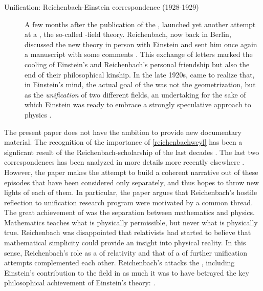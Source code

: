 \documentclass[draft]{article}
\newcommand{\PRZL}{\citetitle{Reichenbach1928}\xspace}
\newcommand{\FP}{\german{Fernparallelismus}\xspace}
\begin{document}
\begin{description}
\item[Unification: Reichenbach-Einstein correspondence (1928-1929)]\label{reichenbacheinsteinII}   A few months after the publication of the \PRZL \citep{Reichenbach1928}, \citet{Einstein19281,Einstein19282} launched yet another attempt at a \uft, the so-called \FP-field theory. Reichenbach, now back in Berlin, discussed the new theory in person with Einstein and sent him once again a manuscript with some comments \citep{Reichenbach1928b}. This exchange of letters marked the cooling of Einstein's and Reichenbach's personal friendship but also the end of their philosophical kinship. In the late 1920s, \citet{Reichenbach1929a,Reichenbach1929b,Reichenbach1929c} came to realize that, in Einstein's mind, the actual goal of the \uftp was not the geometrization, but as the \emph{unification} of two different fields, an undertaking for the sake of which Einstein was ready to embrace a strongly speculative approach to physics \citep{Dongen2010}.  
\end{description}

The present paper does not have the ambition to provide new documentary material. The recognition of the importance of \cref{reichenbachweyl} has been a signficant result of the Reichenbach-scholarship of the last decades \citep{Ryckman1995,Ryckman1996}. The last two correspondences has been analyzed in more details more recently elsewhere \citep{Giovanelli2016d,Giovanelli2022}. However, the paper makes the attempt to build a coherent narrative out of these episodes that have been considered only separately, and thus hopes to throw new lights of each of them. In particular, the paper argues that Reichenbach's hostile reflection to unification research program were motivated by a common thread. The great achievement of \gr was the separation between mathematics and physics. Mathematics teaches what is physically permissible, but never what is physically true. Reichenbach was disappointed that relativists had started to believe that mathematical simplicity could provide an insight into physical reality. In this sense, Reichenbach's role as a  of relativity and that of a  of further unification attempts complemented each other. Reichenbach's attacks the \uftp, including Einstein's contribution to the field in as much it was to have betrayed the key philosophical achievement of Einstein's theory:  \citep[11]{Reichenbach1929}.   
\end{document}

